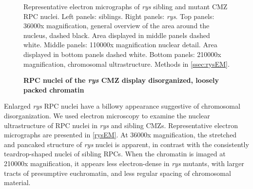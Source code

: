 \documentclass{ut-thesis}
\begin{document}
\begin{NoHyper}
\FloatBarrier

\begin{figure}[!h]
    \caption{{\bf RPC nuclei of the \textit{rys} CMZ display disorganized, loosely packed chromatin}}
    Representative electron micrographs of \textit{rys} sibling and mutant CMZ RPC nuclei.
    Left panels: siblings. Right panels: \textit{rys}. Top panels: 36000x magnification, general overview of the area around the nucleus, dashed black. Area displayed in middle panels dashed white. Middle panels: 110000x magnification nuclear detail. Area displayed in bottom panels dashed white. Bottom panels: 210000x magnification, chromosomal ultrastructure.
    Methods in \autoref{ssec:rysEM}.
    \label{rysEM}
\end{figure}

Enlarged \textit{rys} RPC nuclei have a billowy appearance suggestive of chromosomal disorganization. We used electron microscopy to examine the nuclear ultrastructure of RPC nuclei in \textit{rys} and sibling CMZs. Representative electron micrographs are presented in \autoref{rysEM}. At 36000x magnification, the stretched and pancaked structure of \textit{rys} nuclei is apparent, in contrast with the consistently teardrop-shaped nuclei of sibling RPCs. When the chromatin is imaged at 210000x magnification, it appears less electron-dense in \textit{rys} mutants, with larger tracts of presumptive euchromatin, and less regular spacing of chromosomal material.
\FloatBarrier


\end{NoHyper}
\end{document}
